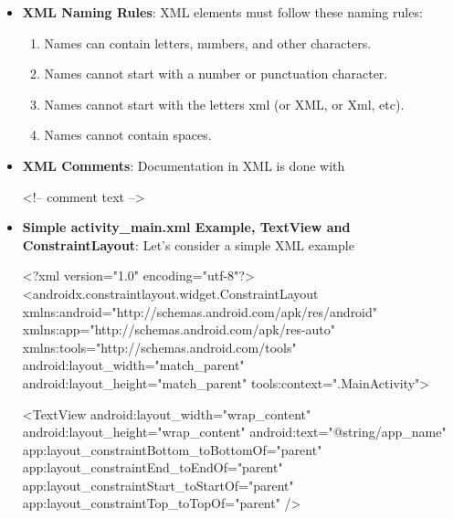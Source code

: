 \documentclass{report}
\begin{document}
\begin{itemize}
\begin{xmlcode}
            \end{xmlcode}
        \item \textbf{XML Naming Rules}: XML elements must follow these naming rules:
            \begin{enumerate}
                \item Names can contain letters, numbers, and other characters.
                \item Names cannot start with a number or punctuation character.
                \item Names cannot start with the letters xml (or XML, or Xml, etc).
                \item Names cannot contain spaces.
            \end{enumerate}
        \item \textbf{XML Comments}: Documentation in XML is done with
            \bigbreak \noindent 
            \begin{xmlcode}
            <!-- comment text -->
            \end{xmlcode}
        \item \textbf{Simple activity\_main.xml Example, TextView and ConstraintLayout}: Let's consider a simple XML example
            \bigbreak \noindent 
            \begin{xmlcode}
                <?xml version="1.0" encoding="utf-8"?>
                <androidx.constraintlayout.widget.ConstraintLayout xmlns:android="http://schemas.android.com/apk/res/android"
                    xmlns:app="http://schemas.android.com/apk/res-auto"
                    xmlns:tools="http://schemas.android.com/tools"
                    android:layout_width="match_parent"
                    android:layout_height="match_parent"
                    tools:context=".MainActivity">

                    <TextView
                        android:layout_width="wrap_content"
                        android:layout_height="wrap_content"
                        android:text="@string/app_name"
                        app:layout_constraintBottom_toBottomOf="parent"
                        app:layout_constraintEnd_toEndOf="parent"
                        app:layout_constraintStart_toStartOf="parent"
                        app:layout_constraintTop_toTopOf="parent" />


\end{xmlcode}
\end{itemize}
\end{document}

